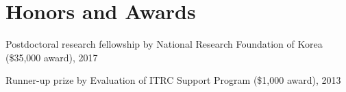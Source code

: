 \section*{Honors and Awards}
\begin{description}
\item Postdoctoral research fellowship by
  National Research Foundation of Korea (\$35,000 award), 2017

\item Runner-up prize by
  Evaluation of ITRC Support Program (\$1,000 award), 2013

\end{description}
